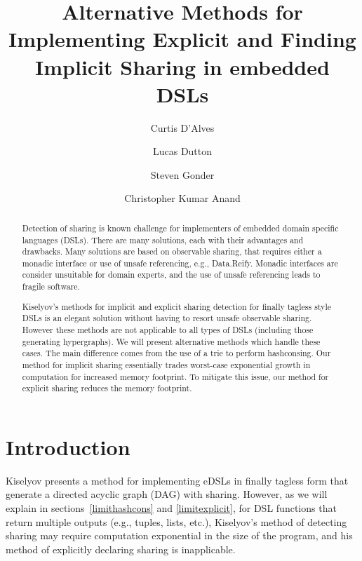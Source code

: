 \documentclass[runningheads]{llncs}
\begin{document}
\lstset{language=haskell}
%
\title{Alternative Methods for Implementing
    Explicit and Finding Implicit Sharing in embedded DSLs}
%
%
\author{Curtis D'Alves \and
Lucas Dutton \and
Steven Gonder \and
Christopher Kumar Anand
}
%
%
%
\maketitle              %
%
\begin{abstract}
  Detection of sharing is known challenge for implementers of embedded domain
  specific languages (DSLs). There are many solutions, each with their
  advantages and drawbacks. Many solutions are based on observable sharing, that
  requires either a monadic interface or use of unsafe referencing, e.g.,
  Data.Reify. Monadic interfaces are consider unsuitable for domain experts, and
  the use of unsafe referencing leads to fragile software.

  Kiselyov's methods for implicit and explicit sharing detection for finally
  tagless style DSLs is an elegant solution without having to resort unsafe
  observable sharing. However these methods are not applicable to all types of
  DSLs (including those generating hypergraphs). We will present alternative
  methods which handle these cases. The main difference comes from the use of a
  trie to perform hashconsing. Our method for implicit sharing essentially
  trades worst-case exponential growth in computation for increased memory
  footprint. To mitigate this issue, our method for explicit sharing reduces the
  memory footprint.

\end{abstract}
%
%
%
\section{Introduction}

Kiselyov \cite{kiselyov:sharing}  presents a method for implementing
eDSLs in finally tagless form that generate a directed acyclic graph (DAG) with
sharing. 
However, as we will explain in sections~\ref{limithashcons} and
\ref{limitexplicit}, for DSL functions that return multiple
outputs (e.g., tuples, lists, etc.), Kiselyov's method of detecting sharing may require computation exponential in the size of the program,
and his method of explicitly declaring sharing is inapplicable.
\end{document}
